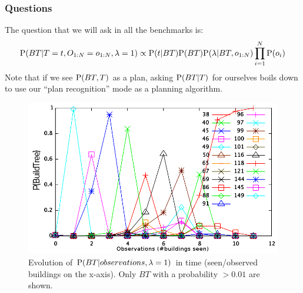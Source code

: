 \subsubsection{Questions}
The question that we will ask in all the benchmarks is:
\begin{equation}
\mathrm{P}(BT|T=t, O_{1:N}=o_{1:N}, \lambda = 1)  \propto \mathrm{P}(t|BT)\mathrm{P}(BT) \mathrm{P}(\lambda | BT, o_{1:N})\prod_{i=1}^N\mathrm{P}(o_{i})
\end{equation}
Note that if we see $\mathrm{P}(BT, T)$ as a plan, asking $\mathrm{P}(BT | T)$ for ourselves boils down to use our ``plan recognition'' mode as a planning algorithm. %

\begin{figure}[h]
\centerline{\includegraphics[width=0.5\columnwidth]{images/techtree_inference_color2.png}}
\caption{Evolution of $\mathrm{P}(BT|observations,\lambda=1)$ in time (seen/observed buildings on the x-axis). Only $BT$ with a probability $> 0.01$ are shown.}
\label{ttinf}
\end{figure}

